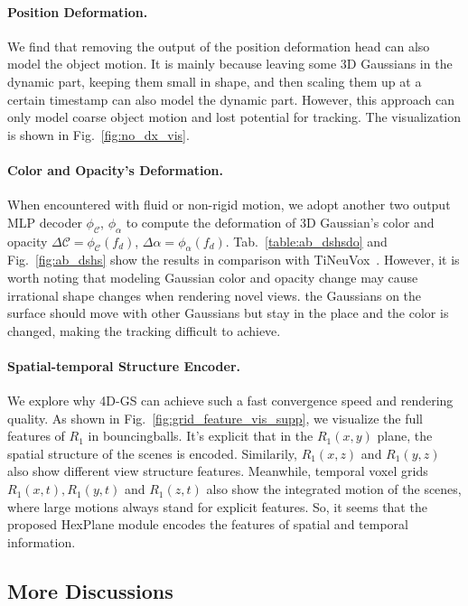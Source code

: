 \documentclass[10pt,twocolumn,letterpaper]{article}
\begin{document}
\paragraph{Position Deformation.} We find that removing the output of the position deformation head can also model the object motion. It is mainly because leaving some 3D Gaussians in the dynamic part, keeping them small in shape, and then scaling them up at a certain timestamp can also model the dynamic part. However, this approach can only model coarse object motion and lost potential for tracking. The visualization is shown in Fig.~\ref{fig:no_dx_vis}.
\paragraph{Color and Opacity's Deformation.}
When encountered with fluid or non-rigid motion, we adopt another two output MLP decoder $\phi_{\mathcal{C}}$, $\phi_\alpha$ to compute the deformation of 3D Gaussian's color and opacity $\Delta \mathcal{C} = \phi_{\mathcal{C}}(f_d)$, $\Delta \alpha = \phi_{\mathcal{\alpha}}(f_d)$. Tab.~\ref{table:ab_dshsdo} and Fig.~\ref{fig:ab_dshs} show the results in comparison with TiNeuVox~\cite{tineuvox}. However, it is worth noting that modeling Gaussian color and opacity change may cause irrational shape changes when rendering novel views. \ie the Gaussians on the surface should move with other Gaussians but stay in the place and the color is changed, making the tracking difficult to achieve.
\paragraph{Spatial-temporal Structure Encoder.}
We explore why 4D-GS can achieve such a fast convergence speed and rendering quality. As shown in Fig.~\ref{fig:grid_feature_vis_supp}, we visualize the full features of $R_1$ in bouncingballs. It's explicit that in the $R_1(x,y)$ plane, the spatial structure of the scenes is encoded. Similarily, $R_1(x,z)$ and $R_1(y,z)$ also show different view structure features. Meanwhile, temporal voxel grids $R_1(x,t),R_1(y,t)$ and $R_1(z,t)$ also show the integrated motion of the scenes, where large motions always stand for explicit features. So, it seems that the proposed HexPlane module encodes the features of spatial and temporal information.


\subsection{More Discussions}
\label{supsec:discussions}
\end{document}
